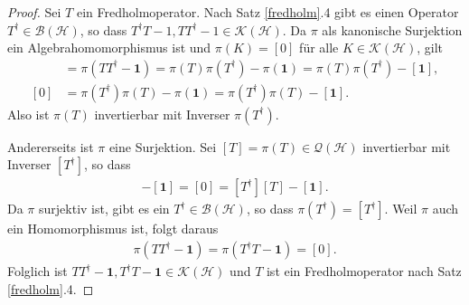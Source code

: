 \documentclass[11pt, hidelinks]{article}
\newcommand{\h}{\mathcal{H}}
\numberwithin{conj}{section}
\begin{document}
\begin{proof}
    Sei $T$ ein Fredholmoperator. Nach Satz \ref{fredholm}.4 gibt es einen Operator $T^\dagger \in \mathcal{B}(\h)$, so dass $T^\dagger T - 1, TT^\dagger - 1 \in \mathcal{K}(\h)$. Da $\pi$ als kanonische Surjektion ein Algebrahomomorphismus ist und $\pi(K) = [0]$ für alle $K \in \mathcal{K}(\h)$, gilt
    \begin{align}
        [0] &=  \pi(TT^\dagger - \mathbf{1}) = \pi(T)\pi(T^\dagger) - \pi(\mathbf{1}) = \pi(T)\pi(T^\dagger)-[\mathbf{1}], \\
        [0] &= \pi(T^\dagger)\pi(T)-\pi(\mathbf{1}) = \pi(T^\dagger)\pi(T)-[\mathbf{1}].
    \end{align}
    Also ist $\pi(T)$ invertierbar mit Inverser $\pi(T^\dagger)$.

    Andererseits ist $\pi$ eine Surjektion. Sei $[T] = \pi(T) \in \mathcal{Q}(\h)$ invertierbar mit Inverser $[T^\dagger]$, so dass
    \begin{align}
        [T][T^\dagger] - [\mathbf{1}] = [0] =[T^\dagger][T] - [\mathbf{1}].
    \end{align}
    Da $\pi$ surjektiv ist, gibt es ein $T^\dagger \in \mathcal{B}(\h)$, so dass $\pi(T^\dagger) = [T^\dagger]$. Weil $\pi$ auch ein Homomorphismus ist, folgt daraus
    \begin{align}
        \pi(TT^\dagger - \mathbf{1}) = \pi(T^\dagger T -\mathbf{1}) = [0].
    \end{align}
    Folglich ist $TT^\dagger-\mathbf{1}, T^\dagger T -\mathbf{1} \in \mathcal{K}(\h)$ und $T$ ist ein Fredholmoperator nach Satz \ref{fredholm}.4.
\end{proof}
\end{document}
